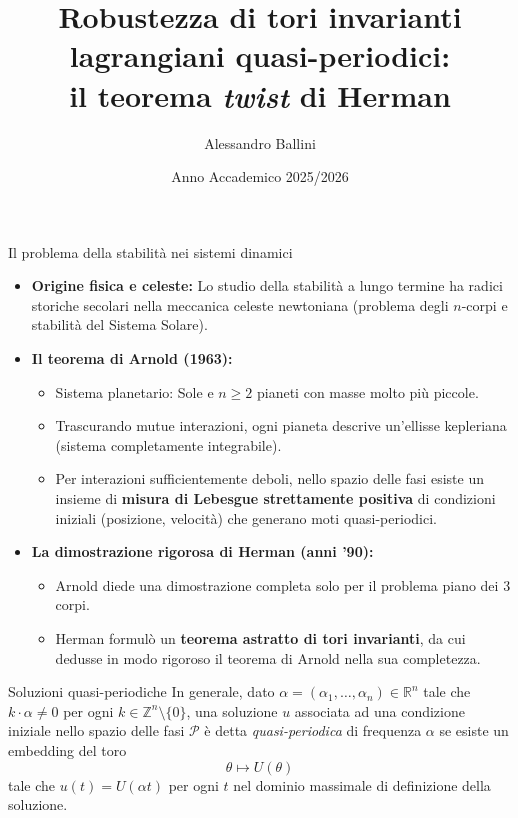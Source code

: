 \documentclass[10pt,aspectratio=169]{beamer}
\title{\textbf{Robustezza di tori invarianti lagrangiani quasi-periodici: \\ il teorema \textit{twist} di Herman}}
\author{\large Alessandro Ballini}
\institute{\large Università degli Studi di Roma Tor Vergata}
\date{Anno Accademico 2025/2026}
\newcommand{\R}{\mathbb{R}}
\newcommand{\Z}{\mathbb{Z}}
\newcommand{\blu}[1]{\textcolor{UniBlue}{\textbf{#1}}}
\begin{document}
\begin{frame}[plain]
  \titlepage
\end{frame}

\begin{frame}{Il problema della stabilità nei sistemi dinamici}
  \begin{itemize}
    \item \blu{Origine fisica e celeste:} Lo studio della stabilità a lungo termine ha radici storiche secolari nella meccanica celeste newtoniana (problema degli $n$-corpi e stabilità del Sistema Solare).
    \medskip
    \item \blu{Il teorema di Arnold (1963):}
    \begin{itemize}
      \item Sistema planetario: Sole e $n \ge 2$ pianeti con masse molto più piccole.
      \item Trascurando mutue interazioni, ogni pianeta descrive un'ellisse kepleriana (sistema \alert{completamente integrabile}).
      \item Per interazioni sufficientemente deboli, nello spazio delle fasi esiste un insieme di \textbf{misura di Lebesgue strettamente positiva} di condizioni iniziali (posizione, velocità) che generano moti \alert{quasi-periodici}.
    \end{itemize}
    \medskip
    \item \blu{La dimostrazione rigorosa di Herman (anni '90):}
    \begin{itemize}
      \item Arnold diede una dimostrazione completa solo per il problema piano dei 3 corpi.
      \item Herman formulò un \textbf{teorema astratto di tori invarianti}, da cui dedusse in modo rigoroso il teorema di Arnold nella sua completezza.
    \end{itemize}
  \end{itemize}
\end{frame}

\begin{frame}{Soluzioni quasi-periodiche}
    In generale, dato $\alpha = (\alpha_1, \dots, \alpha_n) \in \R^n$ tale che $k \cdot \alpha \neq 0$ per ogni $k \in \Z^n \setminus \{0\}$, una soluzione $u$ associata ad una condizione iniziale nello spazio delle fasi $\mathcal{P}$ è detta \textit{quasi-periodica} di frequenza $\alpha$ se esiste un embedding del toro
    \[
      \theta \mapsto U(\theta)
    \]
    tale che $u(t) = U(\alpha t)$ per ogni $t$ nel dominio massimale di definizione della soluzione.
\end{frame}
\end{document}
